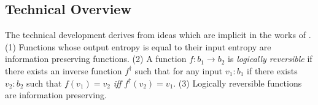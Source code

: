 \documentclass{article}
\begin{document}

\subsection{Technical Overview}

The technical development derives from ideas which are implicit in the
works of \cite{toffoli:1980, Zuliani:2001:LR,
  malacaria2007assessing,ClarkHM07,Ghica:2007:GSS:1190216.1190269}.
(1) Functions whose output entropy is equal to their input entropy are
information preserving functions.  (2) A function
$f : b_1 \rightarrow b_2$ is \emph{logically reversible} if there
exists an inverse function $f^{\dagger}$ such that for any input
$v_1:b_1$ if there exists $v_2:b_2$ such that $f(v_1)=v_2$ \emph{iff}
$f^{\dagger}(v_2)=v_1$.  (3) Logically reversible functions are
information preserving.
\end{document}
